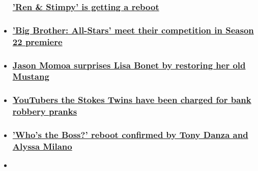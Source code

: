 \begin{itemize}
{  \subsubsection{\texorpdfstring{\href{/2020/08/05/entertainment/ren-stimpy-reboot/index.html}{'Ren
  \& Stimpy' is getting a
  reboot}}{'Ren \& Stimpy' is getting a reboot}}\label{ren--stimpy-is-getting-a-reboot}}
\item
  \hypertarget{big-brother-all-stars-meet-their-competition-in-season-22-premiere}{%
  \subsubsection{\texorpdfstring{\href{/2020/08/06/entertainment/big-brother/index.html}{'Big
  Brother: All-Stars' meet their competition in Season 22
  premiere}}{'Big Brother: All-Stars' meet their competition in Season 22 premiere}}\label{big-brother-all-stars-meet-their-competition-in-season-22-premiere}}
\item
  \hypertarget{jason-momoa-surprises-lisa-bonet-by-restoring-her-old-mustang-}{%
  \subsubsection{\texorpdfstring{\href{/2020/08/05/entertainment/jason-momoa-surprises-wife-lisa-bonet-mustang/index.html}{Jason
  Momoa surprises Lisa Bonet by restoring her old Mustang
  }}{Jason Momoa surprises Lisa Bonet by restoring her old Mustang }}\label{jason-momoa-surprises-lisa-bonet-by-restoring-her-old-mustang-}}
\item
  \hypertarget{youtubers-the-stokes-twins-have-been-charged-for-bank-robbery-pranks}{%
  \subsubsection{\texorpdfstring{\href{/2020/08/06/entertainment/stokes-twins-youtubers-charged-swatting-pranks-trnd/index.html}{YouTubers
  the Stokes Twins have been charged for bank robbery
  pranks}}{YouTubers the Stokes Twins have been charged for bank robbery pranks}}\label{youtubers-the-stokes-twins-have-been-charged-for-bank-robbery-pranks}}
\item
  \hypertarget{whos-the-boss-reboot-confirmed-by-tony-danza-and-alyssa-milano}{%
  \subsubsection{\texorpdfstring{\href{/2020/08/05/entertainment/whos-boss-reboot-trnd/index.html}{'Who's
  the Boss?' reboot confirmed by Tony Danza and Alyssa
  Milano}}{'Who's the Boss?' reboot confirmed by Tony Danza and Alyssa Milano}}\label{whos-the-boss-reboot-confirmed-by-tony-danza-and-alyssa-milano}}
\item
  \hypertarget{brian-austin-greens-heart-belongs-to-his-boys}{%
}
\end{itemize}

